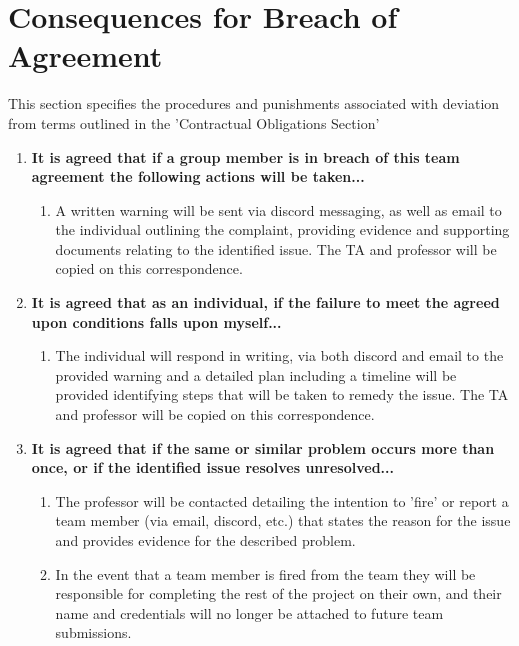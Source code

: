 \documentclass{article}
\begin{document}
\section{Consequences for Breach of Agreement}
    This section specifies the procedures and punishments associated with deviation from terms outlined in the 'Contractual Obligations Section'
    \begin{enumerate}
        \item \textbf{It is agreed that if a group member is in breach of this team agreement the following actions will be taken...}
            \begin{enumerate}
                \item A written warning will be sent via discord messaging, as well as email to the individual outlining the complaint, providing evidence and supporting documents relating to the identified issue. The TA and professor will be copied on this correspondence.
            \end{enumerate}
        \item \textbf{It is agreed that as an individual, if the failure to meet the agreed upon conditions falls upon myself...}\
            \begin{enumerate}
                \item The individual will respond in writing, via both discord and email to the provided warning and a detailed plan including a timeline will be provided identifying steps that will be taken to remedy the issue. The TA and professor will be copied on this correspondence.
            \end{enumerate}
        \item \textbf{It is agreed that if the same or similar problem occurs more than once, or if the identified issue resolves unresolved...}
            \begin{enumerate}
                \item The professor will be contacted detailing the intention to 'fire' or report a team member (via email, discord, etc.) that states the reason for the issue and provides evidence for the described problem.
                \item In the event that a team member is fired from the team they will be responsible for completing the rest of the project on their own, and their name and credentials will no longer be attached to future team submissions.
            \end{enumerate}
    \end{enumerate}
\end{document}
